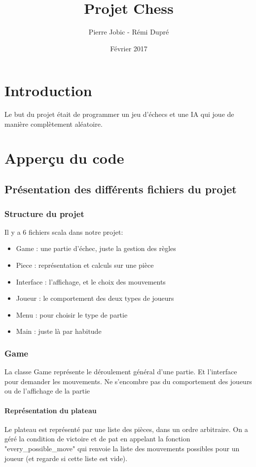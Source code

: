 \documentclass{article}
\title{Projet Chess}
\author{Pierre Jobic - Rémi Dupré}
\date{Février 2017}
\begin{document}
\maketitle

\section{Introduction}

Le but du projet était de programmer un jeu d'échecs et une IA qui joue de manière complètement aléatoire.


\section{Apperçu du code}

\subsection{Présentation des différents fichiers du projet}

\subsubsection{Structure du projet}
Il y a 6 fichiers scala dans notre projet:
\begin{itemize}
    \item Game : une partie d'échec, juste la gestion des règles
    \item Piece : représentation et calculs sur une pièce
    \item Interface : l'affichage, et le choix des mouvements
    \item Joueur : le comportement des deux types de joueurs
    \item Menu : pour choisir le type de partie
    \item Main : juste là par habitude
\end{itemize}

\subsubsection{Game}
La classe Game représente le déroulement général d'une partie. Et l'interface pour demander les mouvements. Ne s'encombre pas du comportement des joueurs ou de l'affichage de la partie

\paragraph{Représentation du plateau}
Le plateau est représenté par une liste des pièces, dans un ordre arbitraire. 
On a géré la condition de victoire et de pat en appelant la fonction "every\_possible\_move" qui renvoie la liste des mouvements possibles pour un joueur (et regarde si cette liste est vide). 
\end{document}
